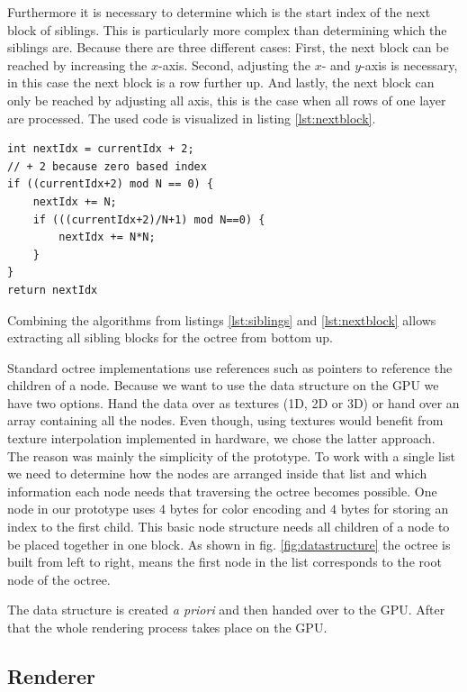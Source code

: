 \documentclass[12pt,conference]{IEEEtran}
\begin{document}
Furthermore it is necessary to determine which is the start index of the next block of siblings. This is particularly more complex than determining which the siblings are. Because there are three different cases: First, the next block can be reached by increasing the $x$-axis. Second, adjusting the $x$- and $y$-axis is necessary, in this case the next block is a row further up. And lastly, the next block can only be reached by adjusting all axis, this is the case when all rows of one layer are processed. The used code is visualized in listing \ref{lst:nextblock}.
\begin{lstlisting}[label=lst:nextblock, caption={Finding the next block start index needs to cover three cases.}]
int nextIdx = currentIdx + 2;
// + 2 because zero based index
if ((currentIdx+2) mod N == 0) {
	nextIdx += N;
	if (((currentIdx+2)/N+1) mod N==0) {
		nextIdx += N*N;
	}
}
return nextIdx
\end{lstlisting}

Combining the algorithms from listings \ref{lst:siblings} and \ref{lst:nextblock} allows extracting all sibling blocks for the octree from bottom up.

\par

Standard octree implementations use references such as pointers to reference the children of a node. Because we want to use the data structure on the GPU we have two options. Hand the data over as textures (1D, 2D or 3D) or hand over an array containing all the nodes. Even though, using textures would benefit from texture interpolation implemented in hardware, we chose the latter approach. The reason was mainly the simplicity of the prototype. To work with a single list we need to determine how the nodes are arranged inside that list and which information each node needs that traversing the octree becomes possible. One node in our prototype uses $4$ bytes for color encoding and $4$ bytes for storing an index to the first child. This basic node structure needs all children of a node to be placed together in one block. As shown in fig. \ref{fig:datastructure} the octree is built from left to right, means the first node in the list corresponds to the root node of the octree. 

The data structure is created \textit{a priori} and then handed over to the GPU. After that the whole rendering process takes place on the GPU.

\subsection{Renderer}
\label{sec:renderer}
\end{document}
